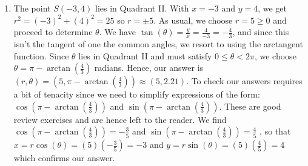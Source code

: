 {\begin{enumerate}
\item  The point $S(-3,4)$ lies in Quadrant II.  With $x = -3$ and $y = 4$, we get $r^2 = (-3)^2 + (4)^2 = 25$ so $r = \pm 5$.  As usual, we choose $r = 5 \geq 0$ and proceed to determine $\theta$.  We have $\tan(\theta) = \frac{y}{x} = \frac{4}{-3} = -\frac{4}{3}$, and since this isn't the tangent of one the common angles, we resort to using the arctangent function. Since $\theta$ lies in Quadrant II and must satisfy $0 \leq \theta < 2\pi$, we choose $\theta = \pi - \arctan\left(\frac{4}{3}\right)$ radians.  Hence, our answer is $(r,\theta) = \left(5, \pi - \arctan\left(\frac{4}{3}\right)\right) \approx (5,2.21)$.  To check our answers requires a bit of tenacity since we need to simplify expressions of the form:  $\cos\left(\pi - \arctan\left(\frac{4}{3}\right)\right)$ and $\sin\left(\pi - \arctan\left(\frac{4}{3}\right)\right)$.  These are good review exercises and are hence left to the reader.  We find  $\cos\left(\pi - \arctan\left(\frac{4}{3}\right)\right) = -\frac{3}{5}$ and $\sin\left(\pi - \arctan\left(\frac{4}{3}\right)\right) = \frac{4}{5}$ , so that $x = r \cos(\theta) = (5)\left(-\frac{3}{5}\right) = -3$ and $y = r \sin(\theta) = (5) \left(\frac{4}{5}\right) = 4$ which confirms our answer.

\end{enumerate}



}

\medskip




